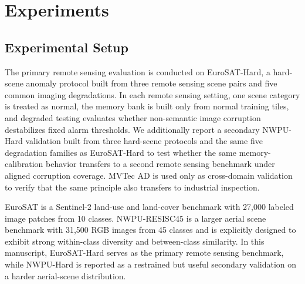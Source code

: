 \documentclass[remotesensing,article,submit,pdftex,moreauthors]{Definitions/mdpi}
\begin{document}
\section{Experiments}
\subsection{Experimental Setup}
The primary remote sensing evaluation is conducted on EuroSAT-Hard, a hard-scene anomaly protocol built from three remote sensing scene pairs and five common imaging degradations. In each remote sensing setting, one scene category is treated as normal, the memory bank is built only from normal training tiles, and degraded testing evaluates whether non-semantic image corruption destabilizes fixed alarm thresholds. We additionally report a secondary NWPU-Hard validation built from three hard-scene protocols and the same five degradation families as EuroSAT-Hard to test whether the same memory-calibration behavior transfers to a second remote sensing benchmark under aligned corruption coverage. MVTec AD is used only as cross-domain validation to verify that the same principle also transfers to industrial inspection.

EuroSAT is a Sentinel-2 land-use and land-cover benchmark with 27,000 labeled image patches from 10 classes. NWPU-RESISC45 is a larger aerial scene benchmark with 31,500 RGB images from 45 classes and is explicitly designed to exhibit strong within-class diversity and between-class similarity. In this manuscript, EuroSAT-Hard serves as the primary remote sensing benchmark, while NWPU-Hard is reported as a restrained but useful secondary validation on a harder aerial-scene distribution.
\end{document}
